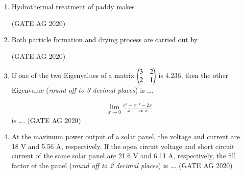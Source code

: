 \documentclass[journal]{IEEEtran}
\begin{document}
\begin{enumerate}
\medskip

\item 
Hydrothermal treatment of paddy makes
\begin{enumerate}
\end{enumerate}
\hfill(GATE AG 2020)\\

\medskip

\item 
Both particle formation and drying process are carried out by
\begin{enumerate}
\end{enumerate}
\hfill(GATE AG 2020)\\

\medskip

\item 
If one of the two Eigenvalues of a matrix
$\begin{pmatrix} 3 & 2 \\ 2 & 1 \end{pmatrix}$ is 4.236, then the other Eigenvalue (\textit{round off to 3 decimal places}) is \dots.

\begin{align*}
\lim_{x \to 0} \frac{e^{x} - e^{-x} - 2x}{x - \sin x}
\end{align*}
is \dots.
\hfill(GATE AG 2020)\\

\medskip


\item 
At the maximum power output of a solar panel, the voltage and current are 18 V and 5.56 A, respectively. If the open circuit voltage and short circuit current of the same solar panel are 21.6 V and 6.11 A, respectively, the fill factor of the panel (\textit{round off to 2 decimal places}) is \dots.
\hfill(GATE AG 2020)\\


\end{enumerate}
\end{document}
